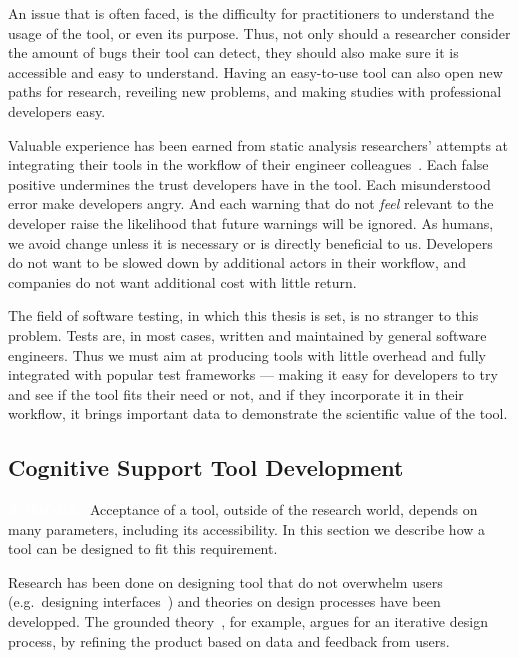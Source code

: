 \documentclass[11pt]{sdm_internship}
\newcommand{\todo}[1]{\colorbox{Red!75}{\textcolor{white}{\textbf{TODO\ifx&#1&\else: #1\fi}}}}
\theoremstyle{definition}
\begin{document}
An issue that is often faced, is the difficulty for practitioners to understand the usage of the tool, or even its purpose.
Thus, not only should a researcher consider the amount of bugs their tool can detect, they should also make sure it is accessible and easy to understand.
Having an easy-to-use tool can also open new paths for research, reveiling new problems, and making studies with professional developers easy.

Valuable experience has been earned from static analysis researchers' attempts at integrating their tools in the workflow of their engineer colleagues~\cite{bessey2010few,sadowski2015tricorder,sadowski2018lessons}.
Each false positive undermines the trust developers have in the tool.
Each misunderstood error make developers angry.
And each warning that do not \emph{feel} relevant to the developer raise the likelihood that future warnings will be ignored.
As humans, we avoid change unless it is necessary or is directly beneficial to us.
Developers do not want to be slowed down by additional actors in their workflow, and companies do not want additional cost with little return.

The field of software testing, in which this thesis is set, is no stranger to this problem.
Tests are, in most cases, written and maintained by general software engineers.
Thus we must aim at producing tools with little overhead and fully integrated with popular test frameworks --- making it easy for developers to try and see if the tool fits their need or not, and if they incorporate it in their workflow, it brings important data to demonstrate the scientific value of the tool.

\subsection{Cognitive Support Tool Development}%
\label{ssec:cognitive_support}
\todo{}
Acceptance of a tool, outside of the research world, depends on many parameters, including its accessibility.
In this section we describe how a tool can be designed to fit this requirement.

Research has been done on designing tool that do not overwhelm users (e.g.\ designing interfaces~\cite{oviatt2006human}) and theories on design processes have been developped.
The grounded theory~\cite{stol2016grounded}, for example, argues for an iterative design process, by refining the product based on data and feedback from users.
\end{document}
